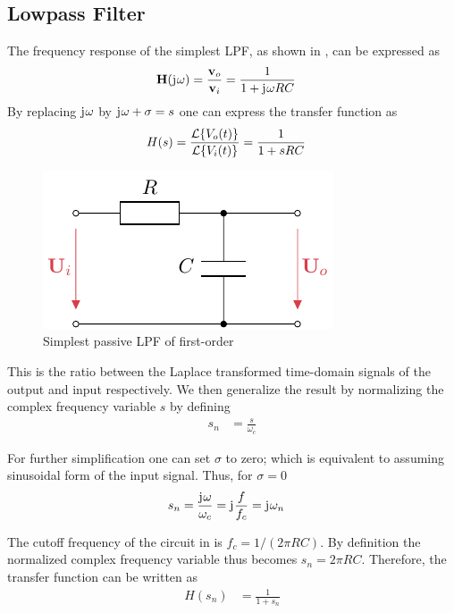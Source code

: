 \subsection{Lowpass Filter}
\cite{Tietze2008EC}

The frequency response of the simplest \ac{LPF}, as shown in , can be expressed as
\begin{align}
  \mathbf{H}(\mathrm{j}\mkern1mu\omega) &= \frac{\mathbf{v}_o}{\mathbf{v}_i} = \frac{1}{1+\mathrm{j}\mkern1mu\omega RC}
\end{align}
By replacing $\mathrm{j}\mkern1mu\omega$ by $\mathrm{j}\mkern1mu\omega+\sigma = s$ one can express the transfer function as
\begin{align}
  H(s) &= \frac{\mathcal{L}\{V_o(t)\}}{\mathcal{L}\{V_i(t)\}} = \frac{1}{1 + sRC}
\end{align}

\begin{figure}[htb!]
  \centering
  \includegraphics[scale=1]{figures/electronics/lowpass/lp_passive_1ord/lp_passive_1ord}
  \caption[Passive first-order \ac{LPF}]{Simplest passive \ac{LPF} of first-order%
    \label{fig:lp_passive_1ord}}
\end{figure}

This is the ratio between the Laplace transformed time-domain signals of the output and input respectively. We then generalize the result by normalizing the complex frequency variable $s$ by defining
\begin{align}
  s_n &= \frac{s}{\omega_c}
\end{align}

For further simplification one can set $\sigma$ to zero; which is equivalent to assuming sinusoidal form of the input signal.
Thus, for $\sigma=0$
\begin{align}
  s_n &= \frac{\mathrm{j}\mkern1mu\omega}{\omega_c} = \mathrm{j}\mkern1mu\frac{f}{f_c} = \mathrm{j}\mkern1mu\omega_n
\end{align}

The cutoff frequency of the circuit in  is $f_c=1/(2\pi RC)$. By definition the normalized complex frequency variable thus becomes $s_n=2\pi RC$. Therefore, the transfer function can be written as
\begin{align}
  H(s_n) &= \frac{1}{1+s_n}
\end{align}

